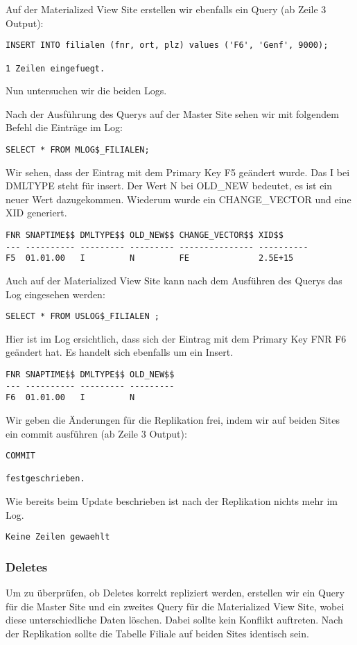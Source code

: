 \documentclass[11pt,a4paper,parskip=half]{scrartcl}
\begin{document}
Auf der Materialized View Site erstellen wir ebenfalls ein Query (ab Zeile 3 Output):
\begin{lstlisting}
INSERT INTO filialen (fnr, ort, plz) values ('F6', 'Genf', 9000);

1 Zeilen eingefuegt.
\end{lstlisting}

Nun untersuchen wir die beiden Logs.

Nach der Ausführung des Querys auf der Master Site sehen wir mit folgendem Befehl die Einträge im Log:
\begin{lstlisting}
SELECT * FROM MLOG$_FILIALEN;
\end{lstlisting}

Wir sehen, dass der Eintrag mit dem Primary Key F5 geändert wurde. Das I bei DMLTYPE steht für insert. Der Wert N bei OLD\_NEW bedeutet, es ist ein neuer Wert dazugekommen. Wiederum wurde ein CHANGE\_VECTOR und eine XID generiert.
\begin{lstlisting}
FNR SNAPTIME$$ DMLTYPE$$ OLD_NEW$$ CHANGE_VECTOR$$ XID$$
--- ---------- --------- --------- --------------- ----------
F5  01.01.00   I         N         FE              2.5E+15 
\end{lstlisting}

Auch auf der Materialized View Site kann nach dem Ausführen des Querys das Log eingesehen werden:
\begin{lstlisting}
SELECT * FROM USLOG$_FILIALEN ;
\end{lstlisting}

Hier ist im Log ersichtlich, dass sich der Eintrag mit dem Primary Key FNR F6 geändert hat. Es handelt sich ebenfalls um ein Insert.
\begin{lstlisting}
FNR SNAPTIME$$ DMLTYPE$$ OLD_NEW$$
--- ---------- --------- ---------
F6  01.01.00   I         N         
\end{lstlisting}

Wir geben die Änderungen für die Replikation frei, indem wir auf beiden Sites ein commit ausführen (ab Zeile 3 Output):
\begin{lstlisting}
COMMIT

festgeschrieben.
\end{lstlisting}

Wie bereits beim Update beschrieben ist nach der Replikation nichts mehr im Log.
\begin{lstlisting}
Keine Zeilen gewaehlt
\end{lstlisting}

\subsubsection{Deletes}
Um zu überprüfen, ob Deletes korrekt repliziert werden, erstellen wir ein Query für die Master Site und ein zweites Query für die Materialized View Site, wobei diese unterschiedliche Daten löschen. Dabei sollte kein Konflikt auftreten. Nach der Replikation sollte die Tabelle Filiale auf beiden Sites identisch sein.
\end{document}

